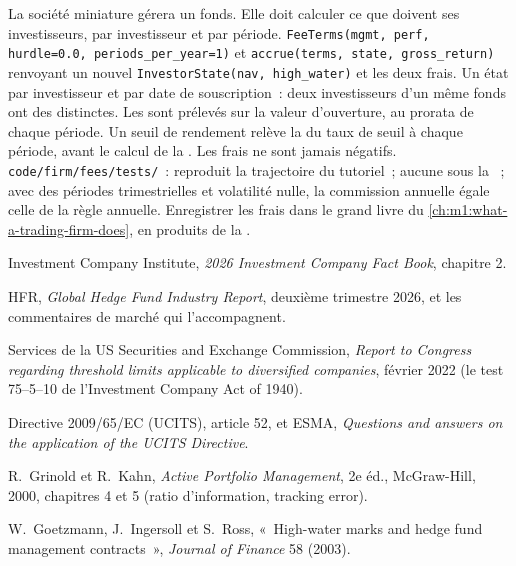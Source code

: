 \begin{build}
 La société miniature gérera un fonds. Elle doit calculer
ce que doivent ses investisseurs, par investisseur et par période.  \texttt{FeeTerms(mgmt, perf, hurdle=0.0,
periods\_per\_year=1)} et \texttt{accrue(terms, state, gross\_return)}
renvoyant un nouvel \texttt{InvestorState(nav, high\_water)} et les deux frais.
 Un état par investisseur et par date de souscription~: deux investisseurs
d'un même fonds ont des  distinctes. Les  sont prélevés sur
la valeur d'ouverture, au prorata de chaque période. Un seuil de rendement relève la  du
taux de seuil à chaque période, avant le calcul de la . Les frais ne sont jamais
négatifs.
 \texttt{code/firm/fees/tests/}~: reproduit la
trajectoire du tutoriel~; aucune  sous la ~; avec des
périodes trimestrielles et volatilité nulle, la commission annuelle égale celle de la règle annuelle.
 Enregistrer les frais dans le grand livre du
\cref{ch:m1:what-a-trading-firm-does}, en produits de la .
\end{build}

\begin{omsources}
\item Investment Company Institute, \emph{2026 Investment Company Fact Book},
chapitre 2.
\item HFR, \emph{Global Hedge Fund Industry Report}, deuxième trimestre 2026, et
les commentaires de marché qui l'accompagnent.
\item Services de la US Securities and Exchange Commission, \emph{Report to Congress
regarding threshold limits applicable to diversified companies}, février
2022 (le test 75--5--10 de l'Investment Company Act of 1940).
\item Directive 2009/65/EC (UCITS), article 52, et ESMA, \emph{Questions and
answers on the application of the UCITS Directive}.
\item R.~Grinold et R.~Kahn, \emph{Active Portfolio Management}, 2e éd.,
McGraw-Hill, 2000, chapitres 4 et 5 (ratio d'information, tracking error).
\item W.~Goetzmann, J.~Ingersoll et S.~Ross, «~High-water marks and hedge
fund management contracts~», \emph{Journal of Finance} 58 (2003).
\end{omsources}

